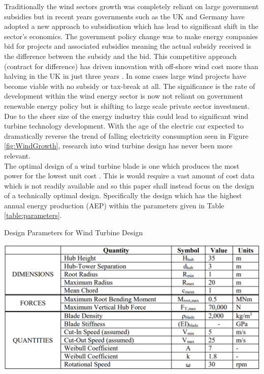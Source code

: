 \documentclass[11pt]{article}
\begin{document}
Traditionally the wind sectors growth was completely reliant on large government subsidies but in recent years governments such as the UK and Germany have adopted a new approach to subsidisation which has lead to significant shift in the sector's economics. The government policy change was to make energy companies bid for projects and associated subsidies meaning the actual subsidy received is the difference between the subsidy and the bid. This competitive approach (contract for difference) has driven innovation with off-shore wind cost more than halving in the UK in just three years \cite{FT}. In some cases large wind projects have become viable with no subsidy or tax-break at all. The significance is the rate of development within the wind energy sector is now not reliant on government renewable energy policy but is shifting to large scale private sector investment. Due to the sheer size of the energy industry this could lead to significant wind turbine technology development. With the age of the electric car expected to dramatically reverse the trend of falling electricity consumption seen in Figure \ref{fig:WindGrowth}, research into wind turbine design has never been more relevant. \\

The optimal design of a wind turbine blade is one which produces the most power for the lowest unit cost \cite{handout}. This is would require a vast amount of cost data which is not readily available and so this paper shall instead focus on the design of a technically optimal design. Specifically the design which has the highest annual energy production (AEP) within the parameters given in Table \ref{table:parameters}. 


\begin{table}
	\centering
	\caption{Design Parameters for Wind Turbine Design \cite{handout}}
	\label{table:parameters}
	\includegraphics[width = 0.8\linewidth]{ParameterTable}
\end{table}

\FloatBarrier
\end{document}
